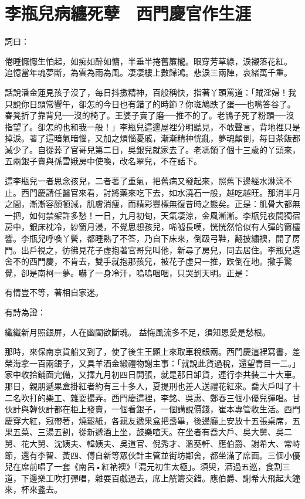 %

\chapter{李瓶兒病纏死孽　西門慶官作生涯}

詞曰：

倦睡懨懨生怕起，如痴如醉如慵，半垂半捲舊簾櫳。眼穿芳草綠，淚襯落花紅。
追憶當年魂夢斷，為雲為雨為風。凄凄樓上數歸鴻。悲淚三兩陣，哀緒萬千重。

話說潘金蓮見孩子沒了，每日抖擻精神，百般稱快，指著丫頭罵道：「賊淫婦！我只說你日頭常響午，卻怎的今日也有錯了的時節？你斑鳩跌了蛋──也嘴答谷了。春凳折了靠背兒──沒的椅了。王婆子賣了磨──推不的了。老鴇子死了粉頭──沒指望了。卻怎的也和我一般！」李瓶兒這邊屋裡分明聽見，不敢聲言，背地裡只是掉淚。著了這暗氣暗惱，又加之煩惱憂戚，漸漸精神恍亂，夢魂顛倒，每日茶飯都減少了。自從葬了官哥兒第二日，吳銀兒就家去了。老馮領了個十三歲的丫頭來，五兩銀子賣與孫雪娥房中使喚，改名翠兒，不在話下。

這李瓶兒一者思念孩兒，二者著了重氣，把舊病又發起來，照舊下邊經水淋漓不止。西門慶請任醫官來看，討將藥來吃下去，如水澆石一般，越吃越旺。那消半月之間，漸漸容顏頓減，肌膚消瘦，而精彩豐標無復昔時之態矣。正是：肌骨大都無一把，如何禁架許多愁！一日，九月初旬，天氣凄涼，金風漸漸。李瓶兒夜間獨宿房中，銀床枕冷，紗窗月浸，不覺思想孩兒，唏噓長嘆，恍恍然恰似有人彈的窗欞響。李瓶兒呼喚丫鬢，都睡熟了不答，乃自下床來，倒趿弓鞋，翻披繡襖，開了房門。出戶視之，彷彿見花子虛抱著官哥兒叫他，新尋了房兒，同去居住。李瓶兒還舍不的西門慶，不肯去，雙手就抱那孩兒，被花子虛只一推，跌倒在地。撒手驚覺，卻是南柯一夢。嚇了一身冷汗，嗚嗚咽咽，只哭到天明。正是：

有情豈不等，著相自家迷。

有詩為證：

纖纖新月照銀屏，人在幽閨欲斷魂。
益悔風流多不足，須知恩愛是愁根。

那時，來保南京貨船又到了，使了後生王顯上來取車稅銀兩。西門慶這裡寫書，差榮海拿一百兩銀子，又具羊酒金緞禮物謝主事：「就說此貨過稅，還望青目一二。」家中收拾鋪面完備，又擇九月初四日開張，就是那日卸貨，連行李共裝二十大車。那日，親朋遞果盒掛紅者約有三十多人，夏提刑也差人送禮花紅來。喬大戶叫了十二名吹打的樂工、雜耍撮弄。西門慶這裡，李銘、吳惠、鄭春三個小優兒彈唱。甘伙計與韓伙計都在柜上發賣，一個看銀子，一個講說價錢，崔本專管收生活。西門慶穿大紅，冠帶著，燒罷紙，各親友遞果盒把盞畢，後邊廳上安放十五張桌席，五果五菜、三湯五割，從新遞酒上坐，鼓樂喧天。在坐者有喬大戶、吳大舅、吳二舅、花大舅、沈姨夫、韓姨夫、吳道官、倪秀才、溫葵軒、應伯爵、謝希大、常峙節，還有李智、黃四、傅自新等眾伙計主管並街坊鄰舍，都坐滿了席面。三個小優兒在席前唱了一套《南呂•紅衲襖》「混元初生太極」。須臾，酒過五巡，食割三道，下邊樂工吹打彈唱，雜耍百戲過去，席上觥籌交錯。應伯爵、謝希大飛起大鐘來，杯來盞去。

